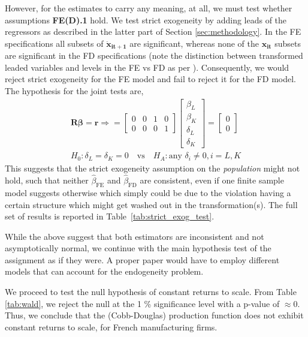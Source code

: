 However, for the estimates to carry any meaning, at all, we must test whether assumptions \textbf{FE(D).1} hold. We test strict exogeneity by adding leads of the regressors as described in the latter part of Section \ref{sec:methodology}. In the FE specifications all subsets of $\bm{\ddot{x}_{it+1}}$ are significant, whereas none of the $\bm{x_{it}}$ subsets are significant in the FD specifications (note the distinction between transformed leaded variables and levels in the FE vs FD  as per \cite{wooldridgeEconometricAnalysisCross2010}). Consequently, we would reject strict exogeneity for the FE model and fail to reject it for the FD model. The hypothesis for the joint tests are, 
\begin{align*}
    \bm{R} \bm{\beta} = \bm{r} \Longrightarrow = \begin{bmatrix}
0 & 0 & 1 & 0 \\
0 & 0 & 0 & 1
\end{bmatrix} \begin{bmatrix}
\beta_L \\ \beta_K \\ \delta_{L} \\ \delta_{K}
\end{bmatrix} = \begin{bmatrix}
0 \\ 0
\end{bmatrix} \\
H_0: \delta_L = \delta_K = 0 \quad \text{vs} \quad H_A: \text{any } \delta_i \neq 0, i=L, K
\end{align*}
This suggests that the strict exogeneity assumption on the \textit{population} might not hold, such that neither $\hat{\beta}_{\text{FE}}$ and $\hat{\beta}_{\text{FD}}$ are consistent, even if one finite sample model suggests otherwise which simply could be due to the violation having a certain structure which might get washed out in the transformation(s). The full set of results is reported in Table~\ref{tab:strict_exog_test}. 



While the above suggest that both estimators are inconsistent and not asymptotically normal, we continue with the main hypothesis test of the assignment as if they were. A proper paper would have to employ different models that can account for the endogeneity problem. 

We proceed to test the null hypothesis of constant returns to scale. From Table \ref{tab:wald}, we reject the null at the 1 \% significance level with a p-value of $\approx 0$. Thus, we conclude that the (Cobb-Douglas) production function does not exhibit constant returns to scale, for French manufacturing firms. 

